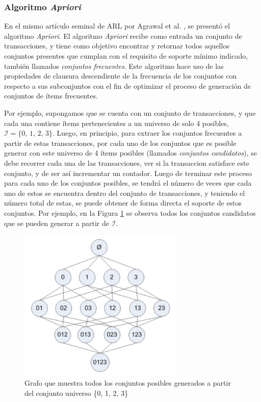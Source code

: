 \subsubsection{Algoritmo \textit{Apriori}}

En el mismo artículo seminal de ARL por Agrawal et al. \cite{agrawal1993mining}, se presentó el algoritmo \textit{Apriori}. El algoritmo \textit{Apriori} recibe como entrada un conjunto de transacciones, y tiene como objetivo encontrar y retornar todos aquellos conjuntos presentes que cumplan con el requisito de soporte mínimo indicado, también llamados \textit{conjuntos frecuentes}. Este algoritmo hace uso de las propiedades de clausura descendiente de la frecuencia de los conjuntos con respecto a sus subconjuntos con el fin de optimizar el proceso de generación de conjuntos de ítems frecuentes.

Por ejemplo, supongamos que se cuenta con un conjunto de transacciones, y que cada una contiene ítems pertenecientes a un universo de solo 4 posibles, $\mathcal{I} = \{0,\,1,\,2,\,3\}$. Luego, en principio, para extraer los conjuntos frecuentes a partir de estas transacciones, por cada uno de los conjuntos que es posible generar con este universo de 4 ítems posibles (llamados \textit{conjuntos candidatos}), se debe recorrer cada una de las transacciones, ver si la transaccion satisface este conjunto, y de ser así incrementar un contador. Luego de terminar este proceso para cada uno de los conjuntos posibles, se tendrá el número de veces que cada uno de estos se encuentra dentro del conjunto de transacciones, y teniendo el número total de estas, se puede obtener de forma directa el soporte de estos conjuntos. Por ejemplo, en la Figura \ref{fig:possible_itemsets} se observa todos los conjuntos candidatos que se pueden generar a partir de $\mathcal{I}$.

\begin{figure}[h!]
\begin{center}
\includegraphics[width=0.7\textwidth]{imagenes/possible_itemsets.png}
\end{center}
\vspace*{-5mm}
\caption{Grafo que muestra todos los conjuntos posibles generados a partir del conjunto universo \{0, 1, 2, 3\}\cite{harrington2012machine}}
\label{fig:possible_itemsets}
\end{figure}

